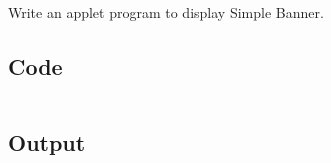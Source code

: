 \documentclass[../main.tex]{subfiles}
\begin{document}
Write an applet program to display Simple Banner.

\subsection{Code}
\inputminted[frame=lines, breaklines, breakanywhere, numberblanklines=false]{java}{./programs/prog19/Banner.java}

\subsection{Output}
\end{document}
